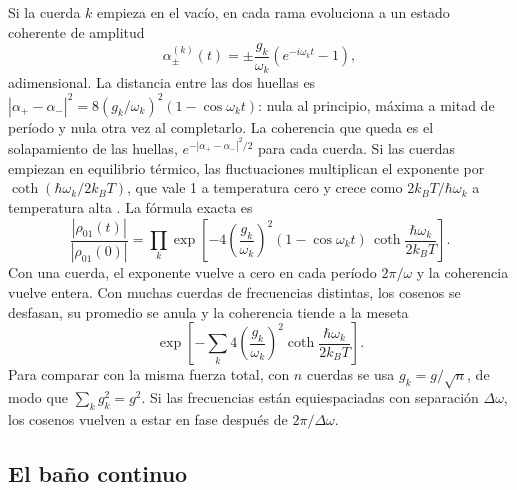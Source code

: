 \documentclass[11pt,a4paper]{article}
\begin{document}
Si la cuerda $k$ empieza en el vacío, en cada rama evoluciona a un estado coherente \parencite{glauber1963} de amplitud
\begin{equation}\label{eq:huellas}
\alpha_\pm^{(k)}(t) = \pm\frac{g_k}{\omega_k}\left(e^{-i\omega_k t} - 1\right),
\end{equation}
adimensional. La distancia entre las dos huellas es $|\alpha_+ - \alpha_-|^2 = 8 (g_k/\omega_k)^2 (1 - \cos\omega_k t)$: nula al principio, máxima a mitad de período y nula otra vez al completarlo. La coherencia que queda es el solapamiento de las huellas, $e^{-|\alpha_+ - \alpha_-|^2/2}$ para cada cuerda. Si las cuerdas empiezan en equilibrio térmico, las fluctuaciones multiplican el exponente por $\coth(\hbar\omega_k/2k_BT)$, que vale 1 a temperatura cero y crece como $2k_BT/\hbar\omega_k$ a temperatura alta \parencite{palma1996,breuer2007}. La fórmula exacta es
\begin{equation}\label{eq:coherencia}
\frac{|\rho_{01}(t)|}{|\rho_{01}(0)|} = \prod_k \exp\!\left[-4\left(\frac{g_k}{\omega_k}\right)^2 (1 - \cos\omega_k t)\,\coth\frac{\hbar\omega_k}{2k_BT}\right].
\end{equation}
Con una cuerda, el exponente vuelve a cero en cada período $2\pi/\omega$ y la coherencia vuelve entera. Con muchas cuerdas de frecuencias distintas, los cosenos se desfasan, su promedio se anula y la coherencia tiende a la meseta
\begin{equation}\label{eq:meseta}
\exp\!\left[-\sum_k 4\left(\frac{g_k}{\omega_k}\right)^2 \coth\frac{\hbar\omega_k}{2k_BT}\right].
\end{equation}
Para comparar con la misma fuerza total, con $n$ cuerdas se usa $g_k = g/\sqrt n$, de modo que $\sum_k g_k^2 = g^2$. Si las frecuencias están equiespaciadas con separación $\Delta\omega$, los cosenos vuelven a estar en fase después de $2\pi/\Delta\omega$.

\subsection{El baño continuo}
\end{document}
